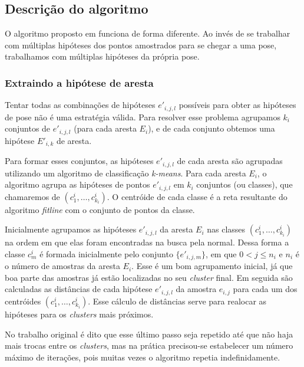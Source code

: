 \subsection{Descrição do algoritmo}

O algoritmo proposto em \cite{celine} funciona de forma diferente. Ao invés de se trabalhar com múltiplas hipóteses dos pontos amostrados para se chegar a uma pose, trabalhamos com múltiplas hipóteses da própria pose.

\subsubsection{Extraindo a hipótese de aresta}

Tentar todas as combinações de hipóteses $e'_{i,j,l}$ possíveis para obter as hipóteses de pose não é uma estratégia válida. Para resolver esse problema agrupamos $k_i$ conjuntos de $e'_{i,j,l}$ (para cada aresta $E_i$), e de cada conjunto obtemos uma hipótese $E'_{i,k}$ de aresta.

Para formar esses conjuntos, as hipóteses $e'_{i,j,l}$ de cada aresta são agrupadas utilizando um algoritmo de classificação \emph{k-means}. Para cada aresta $E_i$, o algoritmo agrupa as hipóteses de pontos $e'_{i,j,l}$ em $k_i$ conjuntos (ou classes), que chamaremos de $(c^i_1, \dots, c^i_{k_i})$. O centróide de cada classe é a reta resultante do algoritmo \emph{fitline} \cite{fitline_doc} com o conjunto de pontos da classe.

Inicialmente agrupamos as hipóteses $e'_{i,j,l}$ da aresta $E_i$ nas classes $(c^i_1, \dots, c^i_{k_i})$ na ordem em que elas foram encontradas na busca pela normal. Dessa forma a classe $c^i_m$ é formada inicialmente pelo conjunto $\{e'_{i,j,m}\}$, em que $0 < j \leq n_i$ e $n_i$ é o número de amostras da aresta $E_i$. Esse é um bom agrupamento inicial, já que boa parte das amostras já estão localizadas no seu \emph{cluster} final. Em seguida são calculadas as distâncias de cada hipótese $e'_{i,j,l}$ da amostra $e_{i,j}$ para cada um dos centróides $(c^i_1, \dots, c^i_{k_i})$. Esse cálculo de distâncias serve para realocar as hipóteses para os \emph{clusters} mais próximos.

No trabalho original \cite{celine} é dito que esse último passo seja repetido até que não haja mais trocas entre os \emph{clusters}, mas na prática precisou-se estabelecer um número máximo de iterações, pois muitas vezes o algoritmo repetia indefinidamente.


